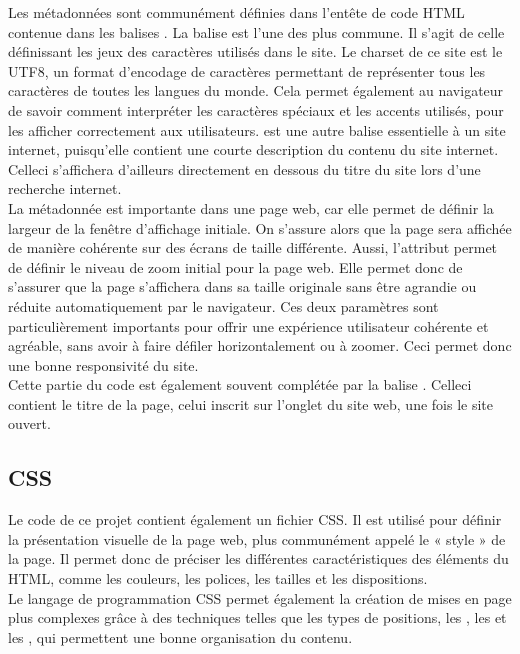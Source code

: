 \documentclass[a4,10pt,french]{sphinxmanual}
\begin{document}
\sphinxAtStartPar
Les métadonnées sont communément définies dans l’entête de code HTML contenue dans les balises .
La balise  est l’une des plus commune. Il s’agit de celle définissant les jeux des caractères utilisés dans le site. Le charset de ce site est le UTF\sphinxhyphen{}8, un format d’encodage de caractères permettant de représenter tous les caractères de toutes les langues du monde. Cela permet également au navigateur de savoir comment interpréter les caractères spéciaux et les accents utilisés, pour les afficher correctement aux utilisateurs.
 est une autre balise essentielle à un site internet, puisqu’elle contient une courte description du contenu du site internet. Celle\sphinxhyphen{}ci s’affichera d’ailleurs directement en dessous du titre du site lors d’une recherche internet.\\
La métadonnée  est importante dans une page web, car elle permet de définir la largeur de la fenêtre d’affichage initiale. On s’assure alors que la page sera affichée de manière cohérente sur des écrans de taille différente. Aussi, l’attribut  permet de définir le niveau de zoom initial pour la page web. Elle permet donc de s’assurer que la page s’affichera dans sa taille originale sans être agrandie ou réduite automatiquement par le navigateur. Ces deux paramètres sont particulièrement importants pour offrir une expérience utilisateur cohérente et agréable, sans avoir à faire défiler horizontalement ou à zoomer. Ceci permet donc une bonne responsivité du site.\\
Cette partie du code est également souvent complétée par la balise . Celle\sphinxhyphen{}ci contient le titre de la page, celui inscrit sur l’onglet du site web, une fois le site ouvert.


\subsection{CSS}
\label{\detokenize{chapitre-02:css}}
\sphinxAtStartPar
Le code de ce projet contient également un fichier CSS. Il est utilisé pour définir la présentation visuelle de la page web, plus communément appelé le « style » de la page. Il permet donc de préciser les différentes caractéristiques des éléments du HTML, comme les couleurs, les polices, les tailles et les dispositions.\\
Le langage de programmation CSS permet également la création de mises en page plus complexes grâce à des techniques telles que les types de positions, les , les  et les , qui permettent une bonne organisation du contenu.
\end{document}
